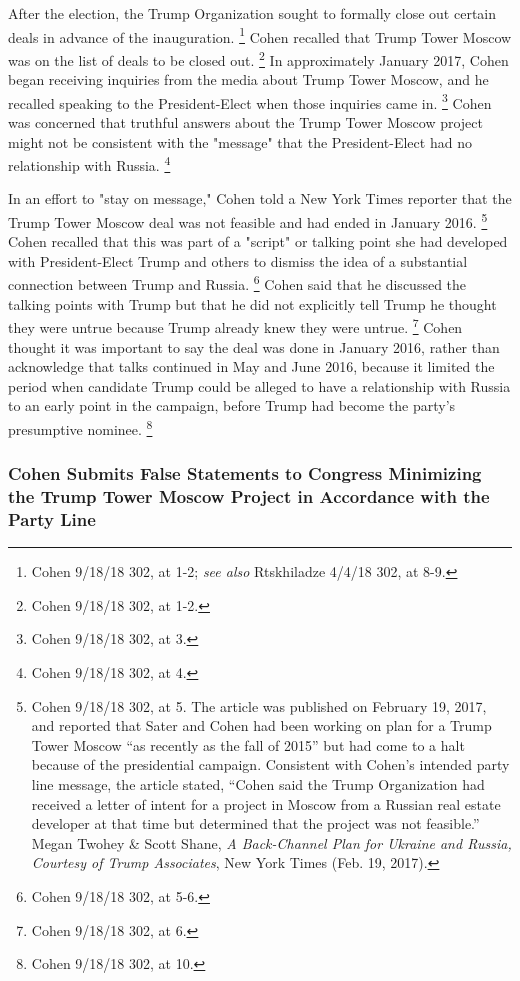 After the election, the Trump Organization sought to formally close out certain deals in advance of the inauguration.%
\footnote{Cohen 9/18/18 302, at 1-2;
\textit{see also} Rtskhiladze 4/4/18 302, at 8-9.}
Cohen recalled that Trump Tower Moscow was on the list of deals to be closed out.%
\footnote{Cohen 9/18/18 302, at 1-2.}
In approximately January 2017, Cohen began receiving inquiries from the media about Trump Tower Moscow, and he recalled speaking to the President-Elect when those inquiries came in.%
\footnote{Cohen 9/18/18 302, at 3.}
Cohen was concerned that truthful answers about the Trump Tower Moscow project might not be consistent with the "message" that the President-Elect had no relationship with Russia.%
\footnote{Cohen 9/18/18 302, at 4.}

In an effort to "stay on message," Cohen told a New York Times reporter that the Trump Tower Moscow deal was not feasible and had ended in January 2016.%
\footnote{Cohen 9/18/18 302, at 5.
The article was published on February 19, 2017, and reported that Sater and Cohen had been working on plan for a Trump Tower Moscow “as recently as the fall of 2015” but had come to a halt because of the presidential campaign.
Consistent with Cohen’s intended party line message, the article stated, “Cohen said the Trump Organization had received a letter of intent for a project in Moscow from a Russian real estate developer at that time but determined that the project was not feasible.”
Megan Twohey \& Scott Shane, \textit{A Back-Channel Plan for Ukraine and Russia, Courtesy of Trump Associates}, New York Times (Feb. 19, 2017).}
Cohen recalled that this was part of a "script" or talking point she had developed with President-Elect Trump and others to dismiss the idea of a substantial connection between Trump and Russia.%
\footnote{Cohen 9/18/18 302, at 5-6.}
Cohen said that he discussed the talking points with Trump but that he did not explicitly tell Trump he thought they were untrue because Trump already knew they were untrue.%
\footnote{Cohen 9/18/18 302, at 6.}
Cohen thought it was important to say the deal was done in January 2016, rather than acknowledge that talks continued in May and June 2016, because it limited the period when candidate Trump could be alleged to have a relationship with Russia to an early point in the campaign, before Trump had become the party's presumptive nominee.%
\footnote{Cohen 9/18/18 302, at 10.}

\subsubsection{Cohen Submits False Statements to Congress Minimizing the Trump Tower Moscow Project in Accordance with the Party Line}

